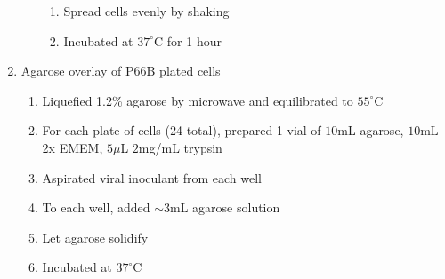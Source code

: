\begin{enumerate}
\begin{enumerate}
\begin{enumerate}
					\item Spread cells evenly by shaking
					\item Incubated at $37^{\circ}$C for 1 hour
				\end{enumerate}
		\end{enumerate}
	\item Agarose overlay of P66B plated cells
		\begin{enumerate}
			\item Liquefied 1.2\% agarose by microwave and equilibrated to $55^{\circ}$C
			\item For each plate of cells (24 total), prepared 1 vial of $10$mL agarose, $10$mL 2x EMEM, $5\mu$L $2$mg/mL trypsin
			\item Aspirated viral inoculant from each well
			\item To each well, added $\sim3$mL agarose solution
			\item Let agarose solidify
			\item Incubated at $37^{\circ}$C
		\end{enumerate}
\end{enumerate}